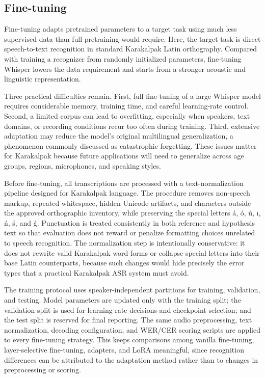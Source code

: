 \documentclass[11pt]{article}
\begin{document}
\subsection{Fine-tuning}

Fine-tuning adapts pretrained parameters to a target task using much less supervised data than full pretraining would require. Here, the target task is direct speech-to-text recognition in standard Karakalpak Latin orthography. Compared with training a recognizer from randomly initialized parameters, fine-tuning Whisper lowers the data requirement and starts from a stronger acoustic and linguistic representation.

Three practical difficulties remain. First, full fine-tuning of a large Whisper model requires considerable memory, training time, and careful learning-rate control. Second, a limited corpus can lead to overfitting, especially when speakers, text domains, or recording conditions recur too often during training. Third, extensive adaptation may reduce the model's original multilingual generalization, a phenomenon commonly discussed as catastrophic forgetting. These issues matter for Karakalpak because future applications will need to generalize across age groups, regions, microphones, and speaking styles.

Before fine-tuning, all transcriptions are processed with a text-normalization pipeline designed for Karakalpak language. The procedure removes non-speech markup, repeated whitespace, hidden Unicode artifacts, and characters outside the approved orthographic inventory, while preserving the special letters á, ó, ú, ı, ń, ś, and ǵ. Punctuation is treated consistently in both reference and hypothesis text so that evaluation does not reward or penalize formatting choices unrelated to speech recognition. The normalization step is intentionally conservative: it does not rewrite valid Karakalpak word forms or collapse special letters into their base Latin counterparts, because such changes would hide precisely the error types that a practical Karakalpak ASR system must avoid.

The training protocol uses speaker-independent partitions for training, validation, and testing. Model parameters are updated only with the training split; the validation split is used for learning-rate decisions and checkpoint selection; and the test split is reserved for final reporting. The same audio preprocessing, text normalization, decoding configuration, and WER/CER scoring scripts are applied to every fine-tuning strategy. This keeps comparisons among vanilla fine-tuning, layer-selective fine-tuning, adapters, and LoRA meaningful, since recognition differences can be attributed to the adaptation method rather than to changes in preprocessing or scoring.
\end{document}

